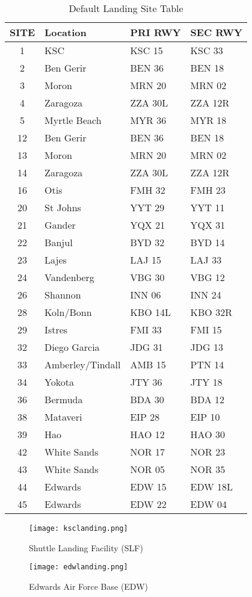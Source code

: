 \documentclass[Space_Shuttle_Vessel_Manual.tex]{subfiles}
\begin{document}
\begin{multicols*}{2}
\begin{table}[H]
  \centering
  \begin{tabularx}{225pt}{c | >{\centering\arraybackslash}p{70pt} | >{\centering\arraybackslash}p{45pt} | >{\centering\arraybackslash}p{45pt}}
    \textbf{SITE} & \textbf{Location} & \textbf{PRI RWY} & \textbf{SEC RWY} \\
    \hline
    1 & KSC & KSC 15 & KSC 33 \\
    2 & Ben Gerir & BEN 36 & BEN 18 \\
    3 & Moron & MRN 20 & MRN 02 \\
    4 & Zaragoza & ZZA 30L & ZZA 12R \\
    5 & Myrtle Beach & MYR 36 & MYR 18 \\
    12 & Ben Gerir & BEN 36 & BEN 18 \\
    13 & Moron & MRN 20 & MRN 02 \\
    14 & Zaragoza & ZZA 30L & ZZA 12R \\
    16 & Otis & FMH 32 & FMH 23 \\
    20 & St Johns & YYT 29 & YYT 11 \\
    21 & Gander & YQX 21 & YQX 31 \\
    22 & Banjul & BYD 32 & BYD 14 \\
    23 & Lajes & LAJ 15 & LAJ 33 \\
    24 & Vandenberg & VBG 30 & VBG 12 \\
    26 & Shannon & INN 06 & INN 24 \\
    28 & Koln/Bonn & KBO 14L & KBO 32R \\
    29 & Istres & FMI 33 & FMI 15 \\
    32 & Diego Garcia & JDG 31 & JDG 13 \\
    33 & Amberley/Tindall & AMB 15 & PTN 14 \\
    34 & Yokota & JTY 36 & JTY 18 \\
    36 & Bermuda & BDA 30 & BDA 12 \\
    38 & Mataveri & EIP 28 & EIP 10 \\
    39 & Hao & HAO 12 & HAO 30 \\
    42 & White Sands & NOR 17 & NOR 23 \\
    43 & White Sands & NOR 05 & NOR 35 \\
    44 & Edwards & EDW 15 & EDW 18L \\
    45 & Edwards & EDW 22 & EDW 04
  \end{tabularx}
  \caption{Default Landing Site Table}
  \label{tab:LandingSites}
\end{table}


\noindent
\begin{figure}[H]
  \texttt{[image: ksclanding.png]}
  \caption{Shuttle Landing Facility (SLF)}
  \label{fig:SLF}
\end{figure}


\noindent
\begin{figure}[H]
  \texttt{[image: edwlanding.png]}
  \caption{Edwards Air Force Base (EDW)}
  \label{fig:EDW}
\end{figure}

\end{multicols*}
\end{document}
